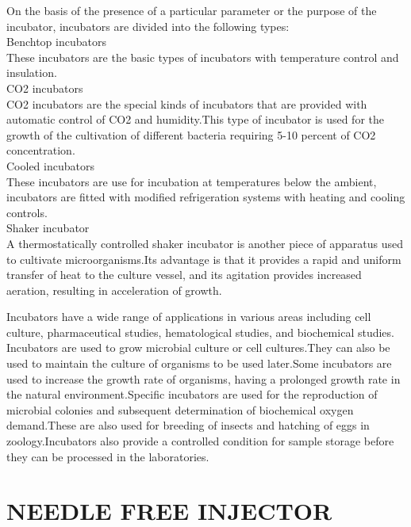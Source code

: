 \documentclass[12pt]{article}
\begin{document}
On the basis of the presence of a particular parameter or the purpose of the incubator, incubators are divided into the following types:\\
Benchtop incubators\\
These incubators are the basic types of incubators with temperature control and insulation.\\
CO2 incubators\\
CO2 incubators are the special kinds of incubators that are provided with automatic control of CO2 and humidity.This type of incubator is used for the growth of the cultivation of different bacteria requiring 5-10 percent of CO2 concentration.\\
Cooled incubators\\
These incubators are use for incubation at temperatures below the ambient, incubators are fitted with modified refrigeration systems with heating and cooling controls.\\
Shaker incubator\\
A thermostatically controlled shaker incubator is another piece of apparatus used to cultivate microorganisms.Its advantage is that it provides a rapid and uniform transfer of heat to the culture vessel, and its agitation provides increased aeration, resulting in acceleration of growth.

\indent

Incubators have a wide range of applications in various areas including cell culture, pharmaceutical studies, hematological studies, and biochemical studies.
Incubators are used to grow microbial culture or cell cultures.They can also be used to maintain the culture of organisms to be used later.Some incubators are used to increase the growth rate of organisms, having a prolonged growth rate in the natural environment.Specific incubators are used for the reproduction of microbial colonies and subsequent determination of biochemical oxygen demand.These are also used for breeding of insects and hatching of eggs in zoology.Incubators also provide a controlled condition for sample storage before they can be processed in the laboratories.

\newpage

\section{NEEDLE FREE INJECTOR}
\end{document}
